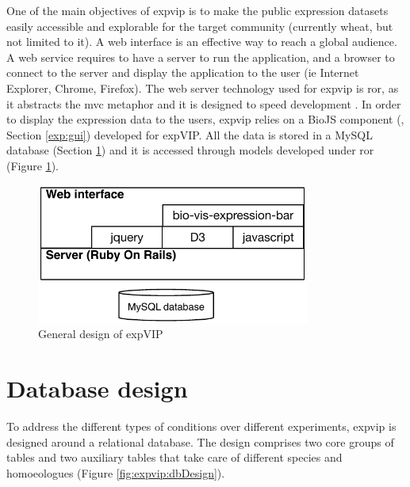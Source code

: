 One of the main objectives of \gls{expvip} is to make the public expression datasets easily accessible and explorable for the target community (currently wheat, but not limited to it). 
A web interface is an effective way to reach a global audience. 
A web service requires to have a server to run the application, and a browser to connect to the server and display the application to the user (ie Internet Explorer, Chrome, Firefox).
The web server technology used for \gls{expvip} is \acrshort{ror}, as it abstracts the \acrshort{mvc} metaphor and it is designed to speed development \citep{RailsGuide2016}. 
In order to display the expression data to the users,  \gls{expvip} relies on a BioJS component (\citealt{Yachdav2015}, Section \ref{exp:gui}) developed for expVIP. 
All the data is stored in a MySQL database (Section \ref{exp:DB}) and it is accessed through models developed under  \acrshort{ror} (Figure \ref{fig:poly:archDesign}).  

\begin{figure}[b] 
  \centering
  \includegraphics[width=0.8\textwidth]{expVIP/Figures/archDesign.pdf}
  \caption{General design of expVIP}
  \label{fig:poly:archDesign}
\end{figure}

\section{Database design} 
\label{exp:DB}

To address the different types of conditions over different experiments, \gls{expvip} is designed around a relational database. 
The design comprises two core groups of tables and two auxiliary tables that take care of different species and homoeologues (Figure \ref{fig:expvip:dbDesign}).


